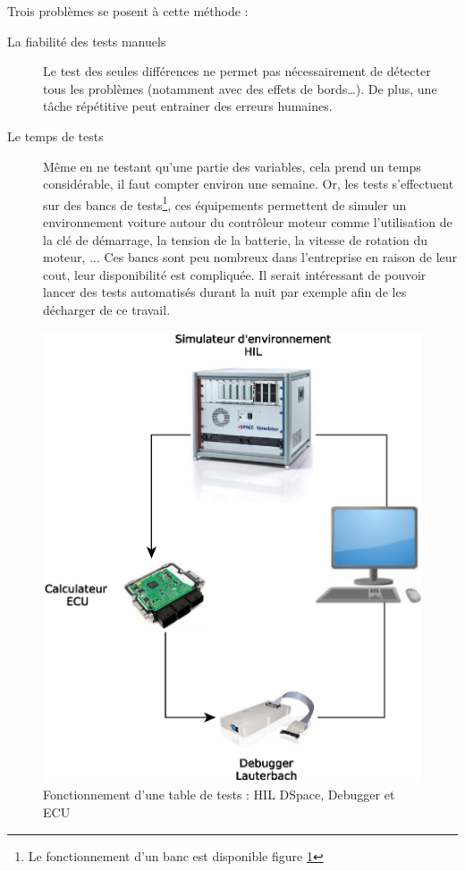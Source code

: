 	Trois problèmes se posent à cette méthode : 
	\begin{description}
		\item[La fiabilité des tests manuels] Le test des seules différences ne permet pas nécessairement de détecter tous les problèmes (notamment avec des effets de bords\ldots). De plus, une tâche répétitive peut entrainer des erreurs humaines.
		\item[Le temps de tests] Même en ne testant qu'une partie des variables, cela prend un temps considérable, il faut compter environ une semaine.
			Or, les tests s'effectuent sur des bancs de tests\footnote{Le fonctionnement d'un banc est disponible figure
			\ref{fig:photoHil}}, ces équipements permettent de simuler un environnement voiture autour du contrôleur moteur comme
			l'utilisation de la clé de démarrage, la tension de la batterie, la vitesse de rotation du moteur, ... Ces bancs sont peu
			nombreux dans l'entreprise en raison de leur cout, leur disponibilité est compliquée. Il serait intéressant de pouvoir lancer
			des tests automatisés durant la nuit par exemple afin de les décharger de ce travail.
	\end{description}

	\begin{figure}[H]
		\centering
		\includegraphics[width=14cm]{contents/images/WB.eps}
		\caption{Fonctionnement d'une table de tests : HIL DSpace, Debugger et ECU}
		\label{fig:photoHil}
	\end{figure}

